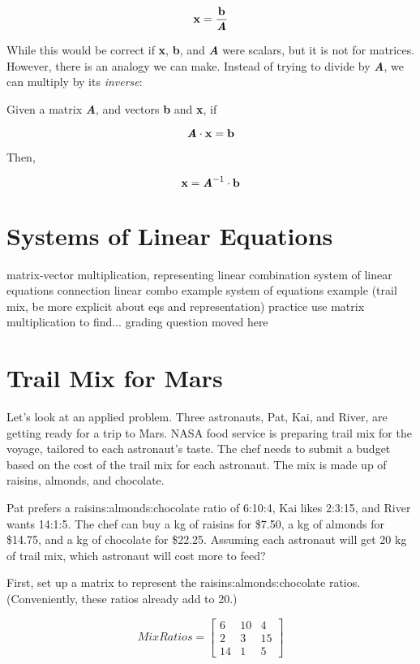 $$\textbf{x} = \frac{\textbf{b}}{\textbf{\textit{A}}}$$

While this would be correct if \textbf{x}, \textbf{b}, and \textbf{\textit{A}} were scalars, but it is not for matrices. However, there is an analogy we can make. Instead of trying to divide by \textbf{\textit{A}}, we can multiply by its \textit{inverse}:

\begin{mdframed}[style = important, frametitle = {Inverse Matrices}]
Given a matrix \textbf{\textit{A}}, and vectors \textbf{b} and \textbf{x}, if

$$\textbf{\textit{A}} \cdot \textbf{x} = \textbf{b}$$

Then,

$$\textbf{x} = \textbf{\textit{A}}^{-1} \cdot \textbf{b}$$
\end{mdframed}


\section{Systems of Linear Equations}
matrix-vector multiplication, representing linear combination
system of linear equations connection
linear combo example
system of equations example (trail mix, be more explicit about eqs and representation)
practice
	use matrix multiplication to find...
	grading question moved here

\section{Trail Mix for Mars}
Let's look at an applied problem. Three astronauts, Pat, Kai, and River, are getting ready for a trip to Mars. NASA food service is preparing trail mix for the voyage, tailored to each astronaut's taste. The chef needs to submit a budget based on the cost of the trail mix for each astronaut. The mix is made up of raisins, almonds, and chocolate.

Pat prefers a raisins:almonds:chocolate ratio of 6:10:4, Kai likes 2:3:15, and River wants 14:1:5. The chef can buy a kg of raisins for \$7.50, a kg of almonds for \$14.75, and a kg of chocolate for \$22.25. Assuming each astronaut will get 20 kg of trail mix, which astronaut will cost more to feed?

First, set up a matrix to represent the raisins:almonds:chocolate ratios. (Conveniently, these ratios already add to 20.)

$$MixRatios = \begin{bmatrix}
6 & 10 & 4  \\
2 & 3 & 15 \\
14 & 1 & 5
\end{bmatrix}$$

